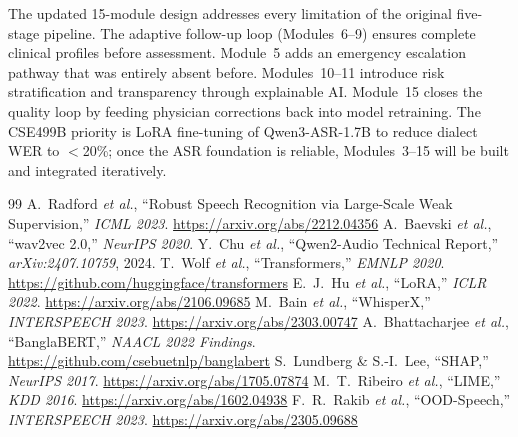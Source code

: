 \documentclass[11pt,a4paper]{article}
\begin{document}
The updated 15-module design addresses every limitation of the original
five-stage pipeline. The adaptive follow-up loop (Modules~6--9) ensures
complete clinical profiles before assessment. Module~5 adds an
emergency escalation pathway that was entirely absent before.
Modules~10--11 introduce risk stratification and transparency through
explainable AI. Module~15 closes the quality loop by feeding physician
corrections back into model retraining. The CSE499B priority is LoRA
fine-tuning of Qwen3-ASR-1.7B to reduce dialect WER to $<$20\%;
once the ASR foundation is reliable, Modules~3--15 will be built
and integrated iteratively.

\begin{thebibliography}{99}\small
{}  A.~Radford \emph{et al.}, ``Robust Speech Recognition via Large-Scale Weak Supervision,'' \emph{ICML 2023}. \url{https://arxiv.org/abs/2212.04356}
  A.~Baevski \emph{et al.}, ``wav2vec 2.0,'' \emph{NeurIPS 2020}.
  Y.~Chu \emph{et al.}, ``Qwen2-Audio Technical Report,'' \emph{arXiv:2407.10759}, 2024.
  T.~Wolf \emph{et al.}, ``Transformers,'' \emph{EMNLP 2020}. \url{https://github.com/huggingface/transformers}
  E.~J.~Hu \emph{et al.}, ``LoRA,'' \emph{ICLR 2022}. \url{https://arxiv.org/abs/2106.09685}
 M.~Bain \emph{et al.}, ``WhisperX,'' \emph{INTERSPEECH 2023}. \url{https://arxiv.org/abs/2303.00747}
 A.~Bhattacharjee \emph{et al.}, ``BanglaBERT,'' \emph{NAACL 2022 Findings}. \url{https://github.com/csebuetnlp/banglabert}
 S.~Lundberg \& S.-I.~Lee, ``SHAP,'' \emph{NeurIPS 2017}. \url{https://arxiv.org/abs/1705.07874}
 M.~T.~Ribeiro \emph{et al.}, ``LIME,'' \emph{KDD 2016}. \url{https://arxiv.org/abs/1602.04938}
 F.~R.~Rakib \emph{et al.}, ``OOD-Speech,'' \emph{INTERSPEECH 2023}. \url{https://arxiv.org/abs/2305.09688}
\end{thebibliography}
\end{document}
